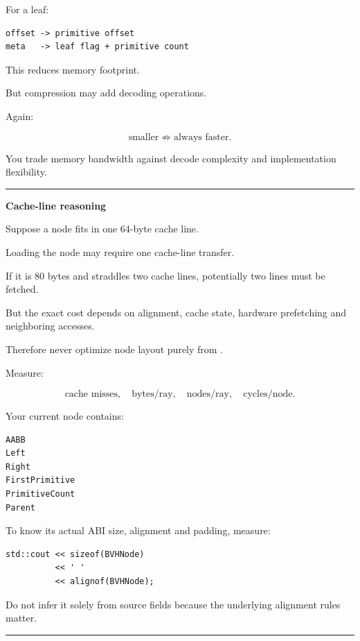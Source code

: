 For a leaf:

\begin{verbatim}
offset -> primitive offset
meta   -> leaf flag + primitive count
\end{verbatim}

This reduces memory footprint.

But compression may add decoding operations.

Again:

\[
\text{smaller}
\not\Rightarrow
\text{always faster}.
\]

You trade memory bandwidth against decode complexity and implementation flexibility.

\begin{center}\rule{0.5\linewidth}{0.5pt}\end{center}

\textbf{Cache-line reasoning}

Suppose a node fits in one 64-byte cache line.

Loading the node may require one cache-line transfer.

If it is 80 bytes and straddles two cache lines, potentially two lines must be fetched.

But the exact cost depends on alignment, cache state, hardware prefetching and neighboring accesses.

Therefore never optimize node layout purely from .

Measure:

\[
\text{cache misses},
\quad
\text{bytes/ray},
\quad
\text{nodes/ray},
\quad
\text{cycles/node}.
\]

Your current node contains:

\begin{verbatim}
AABB
Left
Right
FirstPrimitive
PrimitiveCount
Parent
\end{verbatim}

To know its actual ABI size, alignment and padding, measure:

\begin{verbatim}
std::cout << sizeof(BVHNode)
          << ' '
          << alignof(BVHNode);
\end{verbatim}

Do not infer it solely from source fields because the underlying  alignment rules matter.

\begin{center}\rule{0.5\linewidth}{0.5pt}\end{center}

